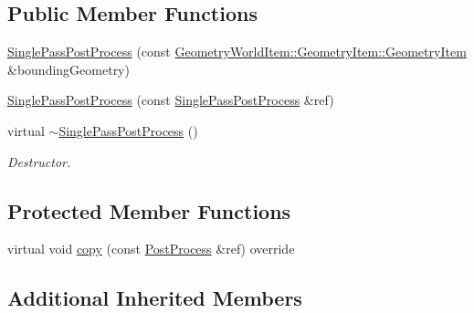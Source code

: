 \subsection*{Public Member Functions}
\begin{DoxyCompactItemize}
\item 
\mbox{\hyperlink{class_geometry_engine_1_1_geometry_post_process_1_1_single_pass_post_process_1_1_single_pass_post_process_ae865c3891d9b9a91ef97a92b62778ee5}{Single\+Pass\+Post\+Process}} (const \mbox{\hyperlink{class_geometry_engine_1_1_geometry_world_item_1_1_geometry_item_1_1_geometry_item}{Geometry\+World\+Item\+::\+Geometry\+Item\+::\+Geometry\+Item}} \&bounding\+Geometry)
\item 
\mbox{\hyperlink{class_geometry_engine_1_1_geometry_post_process_1_1_single_pass_post_process_1_1_single_pass_post_process_ad7fa78d4f0933ea4005612b4cdb2f34a}{Single\+Pass\+Post\+Process}} (const \mbox{\hyperlink{class_geometry_engine_1_1_geometry_post_process_1_1_single_pass_post_process_1_1_single_pass_post_process}{Single\+Pass\+Post\+Process}} \&ref)
\item 
\mbox{\label{class_geometry_engine_1_1_geometry_post_process_1_1_single_pass_post_process_1_1_single_pass_post_process_a0196a6e92096fed80993c887054f6eef}} 
virtual \mbox{\hyperlink{class_geometry_engine_1_1_geometry_post_process_1_1_single_pass_post_process_1_1_single_pass_post_process_a0196a6e92096fed80993c887054f6eef}{$\sim$\+Single\+Pass\+Post\+Process}} ()
\begin{DoxyCompactList}\small\item\em Destructor. \end{DoxyCompactList}\end{DoxyCompactItemize}
\subsection*{Protected Member Functions}
\begin{DoxyCompactItemize}
\item 
virtual void \mbox{\hyperlink{class_geometry_engine_1_1_geometry_post_process_1_1_single_pass_post_process_1_1_single_pass_post_process_ab47b36f68057dcff05402a9e5a630878}{copy}} (const \mbox{\hyperlink{class_geometry_engine_1_1_geometry_post_process_1_1_post_process}{Post\+Process}} \&ref) override
\end{DoxyCompactItemize}
\subsection*{Additional Inherited Members}


